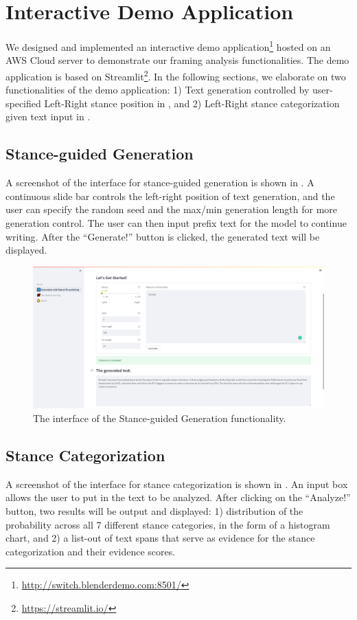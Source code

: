 \chapter{Interactive Demo Application}
We designed and implemented an interactive demo application\footnote{\url{http://switch.blenderdemo.com:8501/}} hosted on an AWS Cloud server to demonstrate our framing analysis functionalities. The demo application is based on Streamlit\footnote{\url{https://streamlit.io/}}. In the following sections, we elaborate on two functionalities of the demo application: 1) Text generation controlled by user-specified Left-Right stance position in , and 2) Left-Right stance categorization given text input in .


\section{Stance-guided Generation}
\label{demo-generation}
A screenshot of the interface for stance-guided generation is shown in . A continuous slide bar controls the left-right position of text generation, and the user can specify the random seed and the max/min generation length for more generation control. The user can then input prefix text for the model to continue writing. After the ``Generate!'' button is clicked, the generated text will be displayed.


\begin{figure}[ht]
    \centering
    \includegraphics[width=\textwidth]{img/demo-generation}
    \caption{The interface of the Stance-guided Generation functionality.}
    \label{fig:demo-generation}
\end{figure}


\section{Stance Categorization}
\label{demo-detection}
A screenshot of the interface for stance categorization is shown in . An input box allows the user to put in the text to be analyzed. After clicking on the ``Analyze!'' button, two results will be output and displayed: 1) distribution of the probability across all 7 different stance categories, in the form of a histogram chart, and 2) a list-out of text spans that serve as evidence for the stance categorization and their evidence scores.


